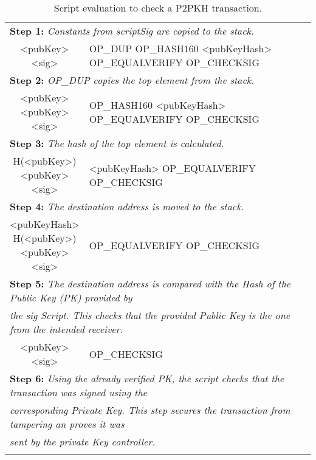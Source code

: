 \begin{table}[tbp]
  \small
    \begin{tabularx}{\textwidth}{| c | X |}
    \hline
	    \thead{Stack} & \thead{Script} \\
	\hline
      \multicolumn{2}{|l|}{\textbf{Step 1: }\textit{%
          Constants from scriptSig are copied to the stack.}} \\
    \hline
	  \makecell{<pubKey>\\<sig>} & OP\_DUP \footnotesize{%
          OP\_HASH160 <pubKeyHash> OP\_EQUALVERIFY OP\_CHECKSIG} \\
    \hline
	  \multicolumn{2}{|l|}{\textbf{Step 2: }\textit{%
	      OP\_DUP copies the top element from the stack.}} \\
    \hline
      \makecell{<pubKey> \\ <pubKey> \\ <sig>} & OP\_HASH160 \footnotesize{%
          <pubKeyHash> OP\_EQUALVERIFY OP\_CHECKSIG} \\
	\hline
      \multicolumn{2}{|l|}{\textbf{Step 3: }\textit{%
          The hash of the top element is calculated.}} \\
    \hline
	  \makecell{H(<pubKey>) \\ <pubKey> \\ <sig>} & <pubKeyHash> \footnotesize{%
          OP\_EQUALVERIFY OP\_CHECKSIG} \\
    \hline
	  \multicolumn{2}{|l|}{\textbf{Step 4: }\textit{%
	      The destination address is moved to the stack.}} \\
	\hline
	  \makecell{<pubKeyHash> \\ H(<pubKey>) \\ <pubKey> \\ <sig>} &%
	      OP\_EQUALVERIFY \footnotesize{OP\_CHECKSIG} \\
	\hline
	  \multicolumn{2}{|l|}{\textbf{Step 5: }\textit{%
	      The destination address is compared with the Hash of the %
          Public Key (PK) provided by}} \\
	  \multicolumn{2}{|l|}{\textit{the sig Script. This checks that the provided %
	      Public Key is the one from the intended receiver.}} \\
	\hline
	  \makecell{<pubKey> \\ <sig>} & OP\_CHECKSIG \\
	\hline
	  \multicolumn{2}{|l|}{\textbf{Step 6: }\textit{%
	      Using the already verified PK, the script checks that the transaction was %
          signed using the}} \\
	  \multicolumn{2}{|l|}{\textit{corresponding Private Key. This step %
	      secures the transaction from tampering an proves it was}} \\
	  \multicolumn{2}{|l|}{\textit{sent by the private Key controller.}} \\
	\hline
	  \makecell{True} & \\
	\hline
    \end{tabularx}
    \caption{Script evaluation to check a P2PKH transaction.}
    \label{tab:p2pkh_exec}
\end{table}

